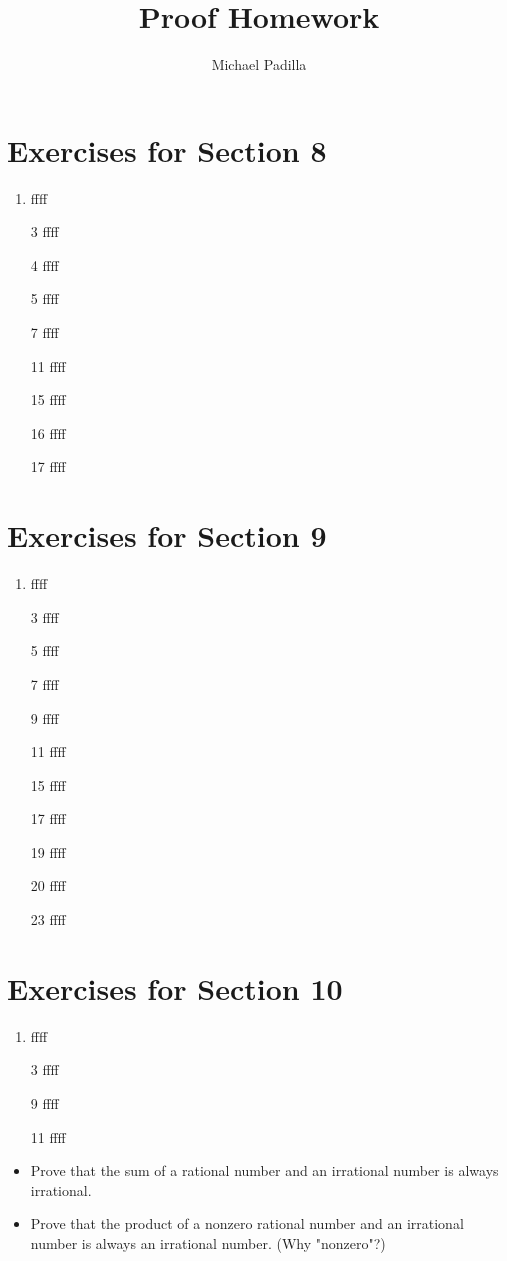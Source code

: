 \documentclass[12pt]{article}
\title{Proof Homework}
\author{Michael Padilla}
\begin{document}
 
\maketitle
\section*{Exercises for Section 8}
\begin{enumerate}
	\item ffff
	\item [3] ffff
	\item [4] ffff
	\item [5] ffff
	\item [7] ffff
	\item [11] ffff
	\item [15] ffff
	\item [16] ffff
	\item [17] ffff
\end{enumerate}
\section*{Exercises for Section 9}
\begin{enumerate}
	\item ffff
	\item [3] ffff
	\item [5] ffff
	\item [7] ffff
	\item [9] ffff
	\item [11] ffff
	\item [15] ffff
	\item [17] ffff
	\item [19] ffff
	\item [20] ffff
	\item [23] ffff
\end{enumerate}
\section*{Exercises for Section 10}
\begin{enumerate}
	\item ffff
	\item [3] ffff
	\item [9] ffff
	\item [11] ffff
\end{enumerate}
\begin{itemize}
	\item Prove that the sum of a rational number and an irrational number is always irrational.
	\item Prove that the product of a nonzero rational number and an irrational number is always an irrational number. (Why "nonzero"?)
\end{itemize}
\end{document}
